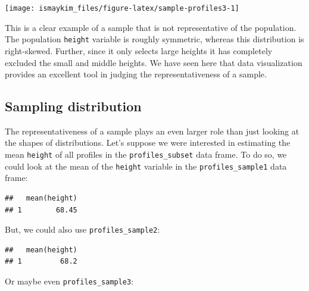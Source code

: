 \documentclass[]{tufte-book}
\newenvironment{Shaded}{\begin{snugshade}}{\end{snugshade}}
\newcommand{\KeywordTok}[1]{\textcolor[rgb]{0.13,0.29,0.53}{\textbf{{#1}}}}
\newcommand{\StringTok}[1]{\textcolor[rgb]{0.31,0.60,0.02}{{#1}}}
\newcommand{\NormalTok}[1]{{#1}}
\begin{document}
\begin{center}\texttt{[image: ismaykim\_files/figure-latex/sample-profiles3-1]} \end{center}

This is a clear example of a sample that is not representative of the
population. The population \texttt{height} variable is roughly
symmetric, whereas this distribution is right-skewed. Further, since it
only selects large heights it has completely excluded the small and
middle heights. We have seen here that data visualization provides an
excellent tool in judging the representativeness of a sample.

\subsection{Sampling distribution}\label{sampling-distribution}

The representativeness of a sample plays an even larger role than just
looking at the shapes of distributions. Let's suppose we were interested
in estimating the mean \texttt{height} of all profiles in the
\texttt{profiles\_subset} data frame. To do so, we could look at the
mean of the \texttt{height} variable in the \texttt{profiles\_sample1}
data frame:

\begin{Shaded}
\end{Shaded}

\begin{verbatim}
##   mean(height)
## 1        68.45
\end{verbatim}

But, we could also use \texttt{profiles\_sample2}:

\begin{Shaded}
\end{Shaded}

\begin{verbatim}
##   mean(height)
## 1         68.2
\end{verbatim}

Or maybe even \texttt{profiles\_sample3}:
\end{document}
